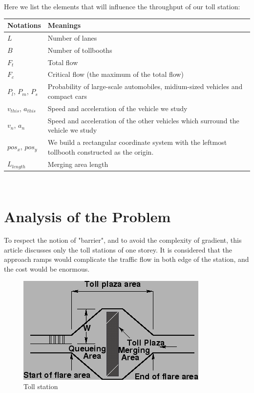 \documentclass{mcmthesis}
\begin{document}
Here we list the elements that will influence the throughput of our toll station:
\begin{table}[h]
\centering
   \begin{tabular}{|m{7cm}<{\centering}|p{7cm}<{\centering}|}
   	
   	\hline
   	Notations & Meanings \\
   	\hline
   	$L$ &  Number of lanes \\
   	\hline
   	$B$ &  Number of tollbooths\\
   	\hline
   	$F_t$ & 	 Total flow\\
   	\hline
   	$F_c$ & Critical flow (the maximum of the total flow)\\
   	\hline
   	$P_l$,  $P_m$, $P_s$ & Probability of large-scale automobiles, midium-sized vehicles and compact cars\\
   	\hline
   	$v_{this}$, $a_{this}$ & Speed and acceleration of the vehicle we study\\
   	\hline
   	$v_n$, $a_n$ &  Speed and acceleration of the other vehicles which surround the vehicle we study\\
   	\hline
   	$pos_x$, $pos_y$ & We build a rectangular coordinate system  with the leftmost tollbooth constructed as the origin.\\
   	\hline
   	$L_{length}$ & Merging area length \\
   	\hline
   	
   \end{tabular}
\end{table}\\





\section{Analysis of the Problem}
To respect the notion of "barrier", and to avoid the complexity of gradient, this article discusses only the toll stations of one storey. It is considered that the approach ramps would complicate the traffic flow in both edge of the station, and the cost would be enormous.

\begin{figure}[htbp]
	\small
	\centering
	\caption{Toll station \cite{note}} \label{fig:Ts}
	\includegraphics{img3.png}
\end{figure}
\end{document}
